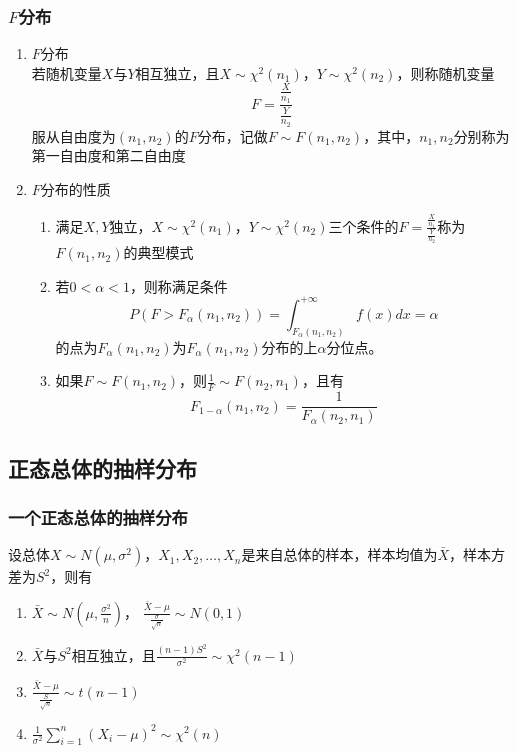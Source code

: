 \subsubsection{$F$分布}
\begin{enumerate}
	\item $F$分布 \\
	若随机变量$X$与$Y$相互独立，且$X\sim \chi^2(n_1)$，$Y\sim \chi^2(n_2)$，则称随机变量
	\begin{equation}
		F = \frac{\frac{X}{n_1}}{\frac{Y}{n_2}}
	\end{equation}
	服从自由度为$(n_1, n_2)$的$F$分布，记做$F \sim F(n_1, n_2)$，其中，$n_1, n_2$分别称为第一自由度和第二自由度
	\item $F$分布的性质 \\
	\begin{enumerate}
		\item 满足$X,Y$独立，$X\sim \chi^2(n_1)$，$Y\sim \chi^2(n_2)$三个条件的$F=\frac{\frac{X}{n_1}}{\frac{Y}{n_2}}$称为$F(n_1, n_2)$的典型模式
		\item 若$0<\alpha<1$，则称满足条件
		\begin{equation}
			P(F > F_{\alpha}(n_1, n_2)) = \int_{F_{\alpha}(n_1, n_2)}^{+\infty}f(x)dx = \alpha
		\end{equation}
		的点为$F_{\alpha}(n_1, n_2)$为$F_{\alpha}(n_1, n_2)$分布的上$\alpha$分位点。
		\item 如果$F\sim F(n_1, n_2)$，则$\frac{1}{F}\sim F(n_2, n_1)$，且有
		\begin{equation}
			F_{1-\alpha}(n_1, n_2) = \frac{1}{F_{\alpha}(n_2, n_1)}
		\end{equation}
	\end{enumerate}
\end{enumerate}


\subsection{正态总体的抽样分布}
\subsubsection{一个正态总体的抽样分布}
设总体$X\sim N(\mu, \sigma^2)$，$X_1, X_2, \dots, X_n$是来自总体的样本，样本均值为$\bar X$，样本方差为$S^2$，则有
\begin{enumerate}
	\item $\bar X \sim N(\mu, \frac{\sigma^2}{n})$， $\frac{\bar X - \mu}{\frac{\sigma}{\sqrt{n}}} \sim N(0,1)$
	\item $\bar X$与$S^2$相互独立，且$\frac{(n-1)S^2}{\sigma^2} \sim \chi^2(n-1)$
	\item $\frac{\bar X - \mu}{\frac{S}{\sqrt{n}}} \sim t(n-1)$
	\item $\frac{1}{\sigma^2}\sum_{i=1}^{n}(X_i-\mu)^2 \sim \chi^2(n)$
\end{enumerate}

